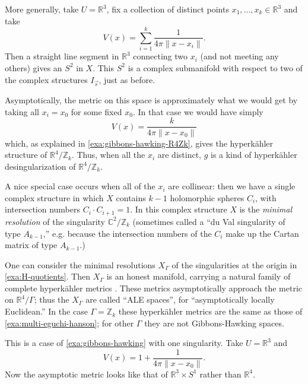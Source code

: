 \documentclass[12pt,letterpaper,reqno]{article}
\numberwithin{equation}{section}
\newcommand{\R}{\ensuremath{\mathbb R}}
\newcommand{\C}{\ensuremath{\mathbb C}}
\newcommand{\Z}{\ensuremath{\mathbb Z}}
\newcommand{\hk}{hyperk\"ahler\xspace}
\newcommand{\norm}[1]{\lVert#1\rVert}
\newcommand{\ti}[1]{\textit{#1}}
\newcommand{\insfig}[2]{

\medskip
\noindent
\begin{minipage}{\linewidth}

\makebox[\linewidth]{\texttt{[image: figures/\#1-crop.pdf]}}

\end{minipage}
\medskip

}
\begin{document}
\begin{example} \cite{MR520463} \label{exa:multi-eguchi-hanson} More generally, take $U = \R^3$, fix a collection
of distinct points $x_1, \dots, x_k \in \R^3$ and take
\begin{equation}
  V(x) = \sum_{i=1}^k \frac{1}{4 \pi \norm{x - x_i}}.
\end{equation}
Then a straight line segment in $\R^3$ connecting two $x_i$ (and not meeting any others)
gives an $S^2$ in $X$. This $S^2$ is a complex submanifold with respect to two of the complex structures $I_{\vec s}$, just as before.

Asymptotically, the metric on this space is approximately
what we would get by taking all $x_i = x_0$ for some fixed $x_0$.
In that case we would have simply
\begin{equation}
 V(x) = \frac{k}{4 \pi \norm{x - x_0}}
\end{equation}
which, as explained in \autoref{exa:gibbons-hawking-R4Zk},
gives the \hk structure of $\R^4 / \Z_k$.
Thus, when all the $x_i$ are distinct,
$g$ is a kind of \hk desingularization of $\R^4 / \Z_k$.

A nice special case occurs when all of the $x_i$ are collinear:
then we have a single complex structure in which $X$ contains $k-1$
holomorphic spheres $C_i$, with intersection numbers
$C_i \cdot C_{i+1} = 1$. In this complex structure $X$ is
the \ti{minimal resolution} of the singularity $\C^2 / \Z_k$
(sometimes called a ``du Val singularity of type $A_{k-1}$,'' e.g.
because the intersection numbers of the $C_i$ make up the
Cartan matrix of type $A_{k-1}$.)
\end{example}

\insfig{higgs-bundles-5}{0.9}

\begin{example} \label{exa:ALE-spaces}
One can consider the minimal resolutions $X_\Gamma$
of the singularities at the origin in \autoref{exa:H-quotients}.
Then $X_\Gamma$ is an honest manifold,
carrying a natural family
of complete \hk metrics \cite{MR90d:53055}.
These metrics asymptotically approach
the metric on $\R^4 / \Gamma$;
thus the $X_\Gamma$ are called ``ALE spaces'',
for ``asymptotically locally Euclidean.''
In the case $\Gamma = \Z_k$ these \hk metrics are
the same as those of \autoref{exa:multi-eguchi-hanson};
for other $\Gamma$ they are not Gibbons-Hawking spaces.
\end{example}

\begin{example}
This is a case of \autoref{exa:gibbons-hawking}
with one singularity.
Take $U = \R^3$ and
\begin{equation}
  V(x) = 1 + \frac{1}{4\pi \norm{x-x_0}}.
\end{equation}
Now the asymptotic metric looks like that of $\R^3 \times S^1$
rather than $\R^4$.
\end{example}
\end{document}
